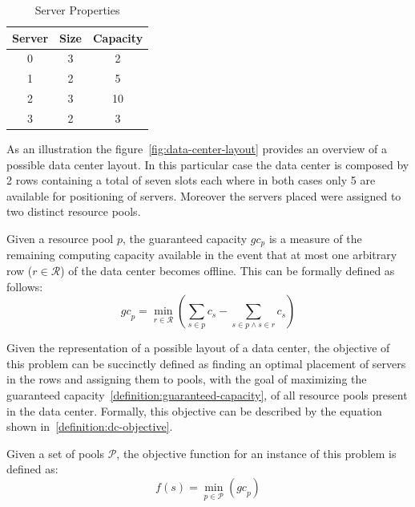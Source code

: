 \begin{table}[ht] \centering \begin{tabular}{ccc} \toprule Server & Size &
               Capacity                       \\ \midrule 0 & 3 & 2 \\ 1 & 2 & 5 \\ 2 & 3 & 10 \\ 3 & 2 & 3 \\
               \bottomrule\end{tabular} \caption{Server Properties} \label{table:
    dc-example-properties} \end{table}

As an illustration the figure~\ref{fig:data-center-layout} provides an overview
of a possible data center layout. In this particular case the data center is
composed by 2 rows containing a total of seven slots each where in both cases
only 5 are available for positioning of servers. Moreover the servers placed
were assigned to two distinct resource pools.

\begin{definition} \label{definition:guaranteed-capacity}
  Given a resource pool $p$, the guaranteed capacity $gc_{p}$ is a measure of the
  remaining computing capacity available in the event that at most one arbitrary
  row ($r\in\mathcal{R}$) of the data center becomes offline. This can be formally
  defined as follows: \begin{equation} {gc}_{p} = \min_{r \in \mathcal{R}}
    ({\sum_{s \in p} c_{s}} - {\sum_{s \in p \wedge s \in r} c_{s}}) \end{equation}
\end{definition}

Given the representation of a possible layout of a data center, the objective
of this problem can be succinctly defined as finding an optimal placement of
servers in the rows and assigning them to pools, with the goal of maximizing the
guaranteed capacity~\ref{definition:guaranteed-capacity}, of all resource pools
present in the data center. Formally, this objective can be described by the
equation shown in~\ref{definition:dc-objective}.

\begin{definition} \label{definition:dc-objective} Given a
  set of pools $\mathcal{P}$, the objective function for an instance of this
  problem is defined as: \begin{equation} f(s) = \min_{p \in \mathcal{P}}
    ({gc}_{p}) \end{equation} \end{definition}

